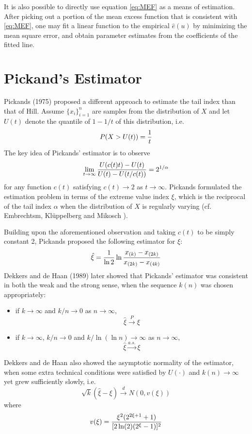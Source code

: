 \documentclass{article}
\begin{document}
It is also possible to directly use equation \eqref{eq:MEF} as a means
of estimation. After picking out a portion of the mean excess function
that is consistent with \eqref{eq:MEF}, one may fit a linear function
to the empirical $\hat e(u)$ by minimizing the mean square error, and
obtain parameter estimates from the coefficients of the fitted line.
\section{Pickand's Estimator}
Pickands (1975) \cite{pickands1975statistical} proposed a different
approach to estimate the tail index than that of Hill. Assume
$\{x_i\}_{i=1}^n$ are samples from the distribution of $X$ and let $U(t)$
denote the quantile of $1 - 1/t$ of this distribution, i.e.
\[
P(X > U(t)) = {1 \over t}
\]
The key idea of Pickands' estimator is to observe
\[
\lim_{t \to \infty} {
  U(c(t) t) - U(t)
  \over
  U(t) - U(t/c(t))
} = 2^{1/\alpha}
\]
for any function $c(t)$ satisfying $c(t) \to 2$ as $t \to \infty$.
Pickands formulated the estimation problem in terms of the extreme
value index $\xi$, which is the reciprocal of the tail index $\alpha$
when the distribution of $X$ is regularly varying (cf. Embrechtsm,
Kl\"uppelberg and Mikosch \cite{Embrechts1997}).

Building upon the aforementioned observation and taking $c(t)$ to
be simply constant 2, Pickands proposed the following estimator for
$\xi$:
\[
\hat \xi = {1 \over \ln 2} \ln {
  x_{(k)} - x_{(2k)}
  \over
  x_{(2k)} - x_{(4k)}
}
\]
Dekkers and de Haan (1989) later showed \cite{dekkers1989estimation}
that Pickands' estimator was consistent in both the weak and the strong
sense, when the sequence $k(n)$ was chosen appropriately:
\begin{itemize}
\item if $k \to \infty$ and $k/n \to 0$ as $n \to \infty$,
  \[
  \hat \xi \overset{P}{\to} \xi
  \]
\item if $k \to \infty$, $k/n \to 0$ and $k / \ln(\ln n) \to \infty$
  as $n \to \infty$,
  \[
  \hat \xi \overset{a.s.}{\to} \xi
  \]
\end{itemize}
Dekkers and de Haan \cite{dekkers1989estimation} also showed the
asymptotic normality of the estimator, when some
extra technical conditions were satisfied by
$U(\cdot)$ and $k(n) \to \infty$ yet grew sufficiently slowly, i.e.
\[
\sqrt k (\hat \xi - \xi) \overset{d}{\to} N(0, v(\xi))
\]
where
\[
v(\xi) = {
  \xi^2 (2^{2 \xi + 1} + 1)
  \over
  [2 \ln(2) (2^\xi - 1)]^2
}
\]
\end{document}

